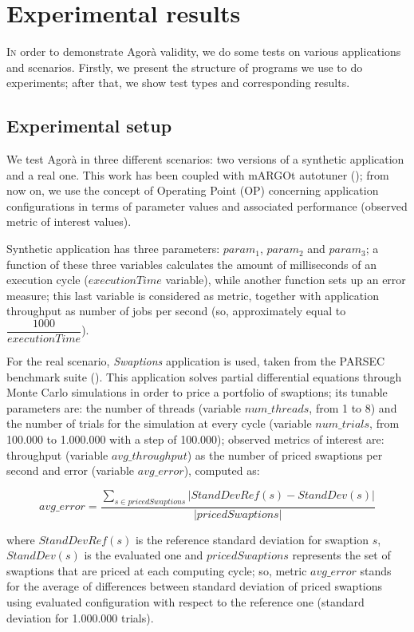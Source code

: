 \chapter{Experimental results}\label{exps}

\lettrine{I}{n} order to demonstrate Agorà validity, we do some tests on various applications and scenarios. Firstly, we present the structure of programs we use to do experiments; after that, we show test types and corresponding results.

\section{Experimental setup}\label{expSetup}

We test Agorà in three different scenarios: two versions of a synthetic application and a real one. This work has been coupled with mARGOt autotuner (\cite{gadioli2015application}); from now on, we use the concept of Operating Point (OP) concerning application configurations in terms of parameter values and associated performance (observed metric of interest values).

Synthetic application has three parameters: $param_1$, $param_2$ and $param_3$; a function of these three variables calculates the amount of milliseconds of an execution cycle ($executionTime$ variable), while another function sets up an error measure; this last variable is considered as metric, together with application throughput as number of jobs per second (so, approximately equal to $\dfrac{1000}{executionTime}$).

For the real scenario, \textit{Swaptions} application is 	used, taken from the PARSEC benchmark suite (\cite{bienia2008parsec}). This application solves partial differential equations through Monte Carlo simulations in order to price a portfolio of swaptions; its tunable parameters are: the number of threads (variable $num\_threads$, from 1 to 8) and the number of trials for the simulation at every cycle (variable $num\_trials$, from 100.000 to 1.000.000 with a step of 100.000); observed metrics of interest are: throughput (variable $avg\_throughput$) as the number of priced swaptions per second and error (variable $avg\_error$), computed as:

\[
avg\_error = \dfrac{\sum_{s \in pricedSwaptions} \left\vert StandDevRef(s) - StandDev(s) \right\vert}{\left\vert pricedSwaptions \right\vert}
\]

where $StandDevRef(s)$ is the reference standard deviation for swaption $s$, $StandDev(s)$ is the evaluated one and $pricedSwaptions$ represents the set of swaptions that are priced at each computing cycle; so, metric $avg\_error$ stands for the average of differences between standard deviation of priced swaptions using evaluated configuration with respect to the reference one (standard deviation for 1.000.000 trials).

